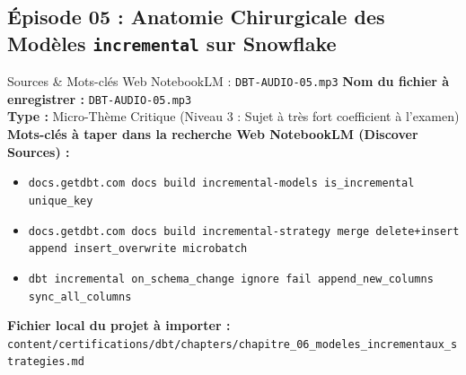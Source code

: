 \documentclass[11pt,a4paper]{article}
\begin{document}
\subsection{Épisode 05 : Anatomie Chirurgicale des Modèles \texttt{incremental} sur Snowflake}
\begin{sourcebox}{Sources \& Mots-clés Web NotebookLM : \texttt{DBT-AUDIO-05.mp3}}
\textbf{Nom du fichier à enregistrer :} \texttt{DBT-AUDIO-05.mp3}\\
\textbf{Type :} Micro-Thème Critique (Niveau 3 : Sujet à très fort coefficient à l'examen)\\
\textbf{Mots-clés à taper dans la recherche Web NotebookLM (Discover Sources) :}
\begin{itemize}[noitemsep]
    \item \texttt{docs.getdbt.com docs build incremental-models is_incremental unique_key}
    \item \texttt{docs.getdbt.com docs build incremental-strategy merge delete+insert append insert_overwrite microbatch}
    \item \texttt{dbt incremental on_schema_change ignore fail append_new_columns sync_all_columns}
\end{itemize}
\textbf{Fichier local du projet à importer :}
\texttt{content/certifications/dbt/chapters/chapitre_06_modeles_incrementaux_strategies.md}
\end{sourcebox}
\end{document}
